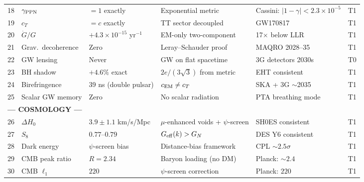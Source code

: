 \documentclass[12pt,a4paper]{article}
\begin{document}
{\begin{longtable}{p{0.4cm}p{2.3cm}p{2.8cm}p{2.4cm}p{2.2cm}p{1.5cm}}
18 & $\gamma_{\rm PPN}$ & $= 1$ exactly &
  Exponential metric &
  Cassini: $|1-\gamma| < 2.3 \times 10^{-5}$ &
  \textcolor{tier1}{T1} \\[2pt]

19 & $c_T$ & $= c$ exactly &
  TT sector decoupled &
  GW170817 &
  \textcolor{tier1}{T1} \\[2pt]

20 & $\dot{G}/G$ & $+4.3 \times 10^{-15}$ yr$^{-1}$ &
  EM-only two-component &
  17$\times$ below LLR &
  \textcolor{tier1}{T1} \\[2pt]

21 & Grav.\ decoherence & Zero &
  Leray--Schauder proof &
  MAQRO 2028--35 &
  \textcolor{tier1}{T1} \\[2pt]

22 & GW lensing & Never &
  GW on flat spacetime &
  3G detectors 2030s &
  \textcolor{tier0}{T0} \\[2pt]

23 & BH shadow & $+4.6\%$ exact &
  $2e/(3\sqrt{3})$ from metric &
  EHT consistent &
  \textcolor{tier1}{T1} \\[2pt]

24 & Birefringence & 39 ns (double pulsar) &
  $c_{\rm EM} \neq c_T$ &
  SKA + 3G $\sim$2035 &
  \textcolor{tier1}{T1} \\[2pt]

25 & Scalar GW memory & Zero &
  No scalar radiation &
  PTA breathing mode &
  \textcolor{tier1}{T1} \\[3pt]

\midrule
\multicolumn{6}{l}{\textbf{\textcolor{derived}{--- COSMOLOGY ---}}} \\
\midrule

26 & $\Delta H_0$ & $3.9 \pm 1.1$ km/s/Mpc &
  $\mu$-enhanced voids + $\psi$-screen &
  SH0ES consistent &
  \textcolor{tier1}{T1} \\[2pt]

27 & $S_8$ & $0.77$--$0.79$ &
  $G_{\rm eff}(k) > G_N$ &
  DES Y6 consistent &
  \textcolor{tier1}{T1} \\[2pt]

28 & Dark energy & $\psi$-screen bias &
  Distance-bias framework &
  CPL $\sim 2.5\sigma$ &
  \textcolor{tier1}{T1} \\[2pt]

29 & CMB peak ratio & $R = 2.34$ &
  Baryon loading (no DM) &
  Planck: $\sim 2.4$ &
  \textcolor{tier1}{T1} \\[2pt]

30 & CMB $\ell_1$ & $220$ &
  $\psi$-screen correction &
  Planck: $220$ &
  \textcolor{tier1}{T1} \\[2pt]


\end{longtable}}
\end{document}
